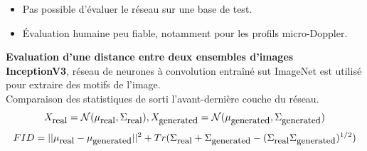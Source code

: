 \documentclass[a0,portrait]{a0poster}
\newcommand{\equtext}[1]{\mbox{\small{#1}}}
\begin{document}
\begin{multicols}{2}
\begin{tcolorbox}[colback=blue!5!lime,colframe=green!75!black,title={\section*{Mesurer les performances d'un GAN?}}]
\begin{itemize}
    \item Pas possible d'évaluer le réseau sur une base de test.
    \item Évaluation humaine peu fiable, notamment pour les profils micro-Doppler.
\end{itemize}
\end{tcolorbox}
\bigskip


\begin{tcolorbox}[colback=blue!5!white,colframe=blue!75!black,title={\section*{FID (Fréchet Inception Distance)}}]
\textbf{Evaluation d'une distance entre deux ensembles d'images}\\
\textbf{InceptionV3}, réseau de neurones à convolution entraîné sut ImageNet est utilisé pour extraire des motifs de l'image.\\
Comparaison des statistiques de sorti l'avant-dernière couche du réseau.%
\Large{
\[X_{\equtext{real}}=\mathcal{N}(\mu_{\equtext{real}}, \Sigma_{\equtext{real}}), X_{\equtext{generated}}=\mathcal{N}(\mu_{\equtext{generated}}, \Sigma_{\equtext{generated}})\]
\[FID = ||\mu_{\equtext{real}} - \mu_{\equtext{generated}}||^2 + Tr(\Sigma_{\equtext{real}} + \Sigma_{\equtext{generated}}  - (\Sigma_{\equtext{real}} \Sigma_{\equtext{generated}})^{1/2})\]
}
\end{tcolorbox}
\bigskip



\end{multicols}
\end{document}
